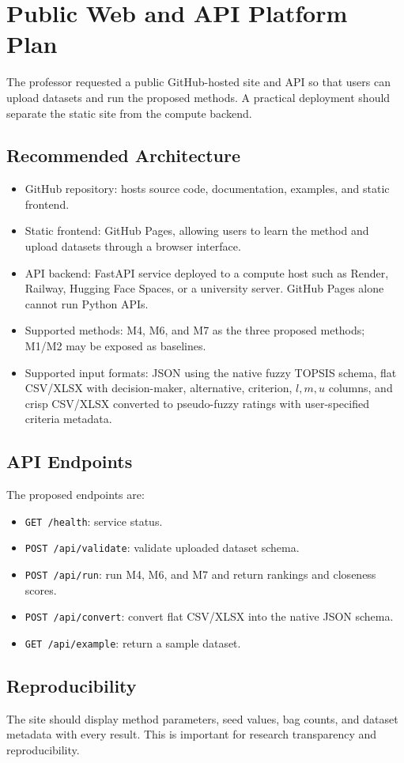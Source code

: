 \chapter{Public Web and API Platform Plan}

The professor requested a public GitHub-hosted site and API so that users can upload datasets and run the proposed methods. A practical deployment should separate the static site from the compute backend.

\section{Recommended Architecture}
\begin{itemize}
    \item GitHub repository: hosts source code, documentation, examples, and static frontend.
    \item Static frontend: GitHub Pages, allowing users to learn the method and upload datasets through a browser interface.
    \item API backend: FastAPI service deployed to a compute host such as Render, Railway, Hugging Face Spaces, or a university server. GitHub Pages alone cannot run Python APIs.
    \item Supported methods: M4, M6, and M7 as the three proposed methods; M1/M2 may be exposed as baselines.
    \item Supported input formats: JSON using the native fuzzy TOPSIS schema, flat CSV/XLSX with decision-maker, alternative, criterion, \(l,m,u\) columns, and crisp CSV/XLSX converted to pseudo-fuzzy ratings with user-specified criteria metadata.
\end{itemize}

\section{API Endpoints}
The proposed endpoints are:
\begin{itemize}
    \item \texttt{GET /health}: service status.
    \item \texttt{POST /api/validate}: validate uploaded dataset schema.
    \item \texttt{POST /api/run}: run M4, M6, and M7 and return rankings and closeness scores.
    \item \texttt{POST /api/convert}: convert flat CSV/XLSX into the native JSON schema.
    \item \texttt{GET /api/example}: return a sample dataset.
\end{itemize}

\section{Reproducibility}
The site should display method parameters, seed values, bag counts, and dataset metadata with every result. This is important for research transparency and reproducibility.
